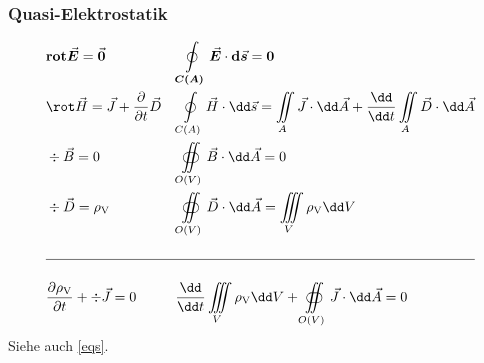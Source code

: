 	  \subsubsection{Quasi-Elektrostatik}
		  \begin{align}
			   & \textbf{rot}\vec{\bm{E}}= \vec{\bm{0}}                      &  & \oint\limits_{\bm{C(A)}}\vec{\bm{E}}\cdot \textbf{d}\vec{\bm{s}}= \bm{0}                                                                       \\
			   & \rot \vec{H}= \vec{J}+\dfrac{\partial}{\partial t}\vec{D}   &  & \oint\limits_{C(A)}\vec{H}\cdot \dd\vec{s}= \iint\limits_{A}\vec{J}\cdot \dd\vec{A}+ \dfrac{\dd}{\dd t}\iint\limits_{A}\vec{D}\cdot \dd\vec{A} \\
			   & \div \vec{B}= 0                                             &  & \oiint\limits_{O(V)}\vec{B}\cdot \dd\vec{A}= 0                                                                                                 \\
			   & \div \vec{D}= \rho_{\text{V}}                               &  & \oiint\limits_{O(V)}\vec{D}\cdot \dd\vec{A}= \iiint\limits_{V}\rho_{\text{V}}\dd V                                                             \\
			  \nonumber                                                                                                                                                                                                          \\
			  \hline
			  \nonumber                                                                                                                                                                                                          \\
			   & \dfrac{\partial \rho_\text{V}}{\partial t}+ \div \vec{J}= 0 &  & \dfrac{\dd}{\dd t}\iiint\limits_{V}\rho_{\text{V}}\dd V + \oiint\limits_{O(V)}\vec{J}\cdot \dd\vec{A}= 0
		  \end{align}
		  Siehe auch \ref{eqs}.
